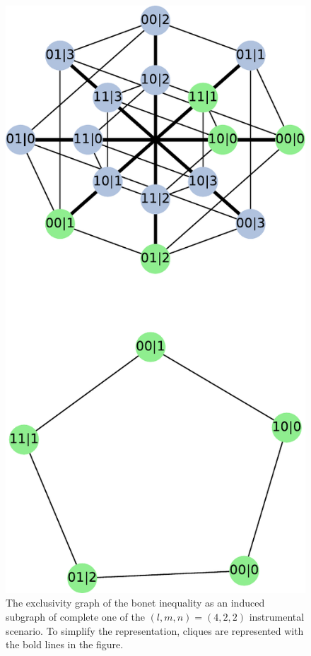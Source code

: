 \documentclass[letterpaper]{article}
\begin{document}
\begin{figure}[t]
    \centering
    \includegraphics[width=.6\columnwidth]{images/instrumental_c5.pdf}
    \caption{The exclusivity graph of the bonet inequality as an induced
    subgraph of complete one of the $(l,m,n)=(4,2,2)$ instrumental
    scenario. To simplify the representation, cliques are represented
    with the bold lines in the figure.}
    \label{fig:bonetexc}
\end{figure}
\end{document}
